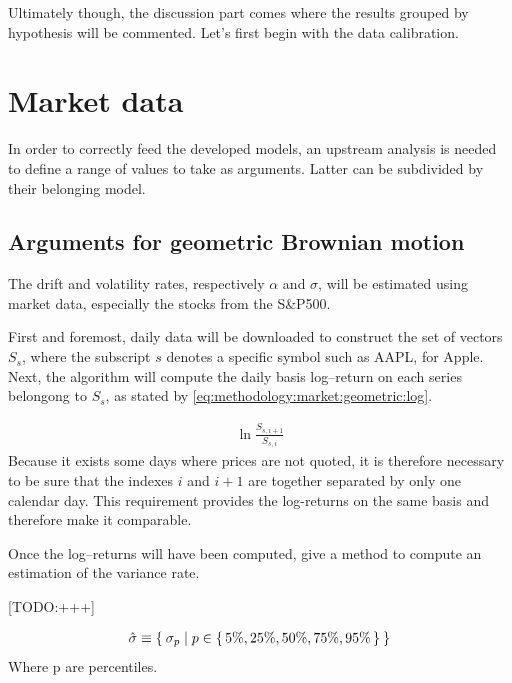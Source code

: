 \documentclass[12pt]{report}
\begin{document}
Ultimately though, the discussion part comes where the results grouped by hypothesis will be commented.
Let's first begin with the data calibration.

\section{Market data}
\label{sec:methodology:market}

In order to correctly feed the developed models, an upstream analysis is needed to define a range of values to take as arguments.
Latter can be subdivided by their belonging model.

\subsection{Arguments for geometric Brownian motion}
\label{sub:methodology:market:geometric}

The drift and volatility rates, respectively $\alpha$ and $\sigma$, will be estimated using market data, especially the stocks from the S\&P500.

First and foremost, daily data will be downloaded to construct the set of vectors $S_s$, where the subscript $s$ denotes a specific symbol such as AAPL, for Apple.
Next, the algorithm will compute the daily basis log--return on each series belongong to $S_s$, as stated by \cref{eq:methodology:market:geometric:log}.

\begin{align}
\ln \frac{S_{s, i+1}}{S_{s, i}} \label{eq:methodology:market:geometric:log}
\end{align}
Because it exists some days where prices are not quoted, it is therefore necessary to be sure that the indexes $i$ and $i + 1$ are together separated by only one calendar day. This requirement provides the log-returns on the same basis and therefore make it comparable.

Once the log--returns will have been computed,  give a method to compute an estimation of the variance rate.

[TODO:+++]

\begin{align}
\hat{\sigma} \equiv \Set{\sigma_p | p \in \set{5\%, 25\%, 50\%, 75\%, 95\%}}
\end{align}
Where p are percentiles.
\end{document}
